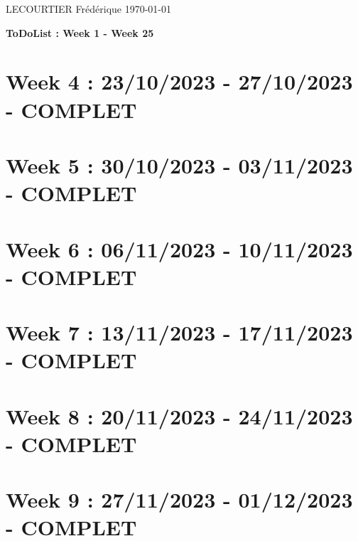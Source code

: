 \documentclass{article}
\begin{document}
	LECOURTIER Frédérique \hfill \today
	\begin{center}
		\Large\textbf{{ToDoList : Week 1 - Week 25}}
	\end{center}
	\tableofcontents

	\newpage

	\section*{Week 4 : 23/10/2023 - 27/10/2023 - COMPLET}
	

	\newpage

	\section*{Week 5 : 30/10/2023 - 03/11/2023 - COMPLET}
	

	\newpage

	\section*{Week 6 : 06/11/2023 - 10/11/2023 - COMPLET}
	

	\newpage

	\section*{Week 7 : 13/11/2023 - 17/11/2023 - COMPLET}
	

	\newpage

	\section*{Week 8 : 20/11/2023 - 24/11/2023 - COMPLET}
	

	\newpage

	\section*{Week 9 : 27/11/2023 - 01/12/2023 - COMPLET}
	
\end{document}
